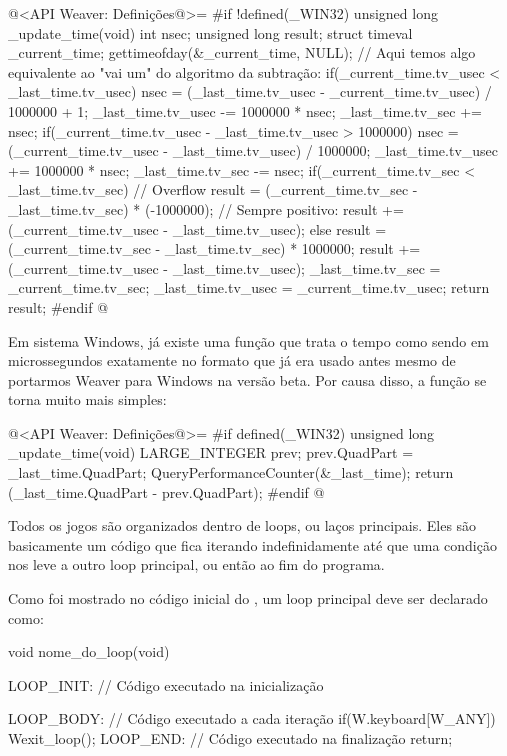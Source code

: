 \iniciocodigo
@<API Weaver: Definições@>=
#if !defined(_WIN32)
unsigned long _update_time(void){
  int nsec;
  unsigned long result;
  struct timeval _current_time;
  gettimeofday(&_current_time, NULL);
  // Aqui temos algo equivalente ao "vai um" do algoritmo da subtração:
  if(_current_time.tv_usec < _last_time.tv_usec){
    nsec = (_last_time.tv_usec - _current_time.tv_usec) / 1000000 + 1;
    _last_time.tv_usec -= 1000000 * nsec;
    _last_time.tv_sec += nsec;
  }
  if(_current_time.tv_usec - _last_time.tv_usec > 1000000){
    nsec = (_current_time.tv_usec - _last_time.tv_usec) / 1000000;
    _last_time.tv_usec += 1000000 * nsec;
    _last_time.tv_sec -= nsec;
  }
  if(_current_time.tv_sec < _last_time.tv_sec){
    // Overflow
    result = (_current_time.tv_sec - _last_time.tv_sec) * (-1000000);
    // Sempre positivo:
    result += (_current_time.tv_usec - _last_time.tv_usec);
  }
  else{
    result = (_current_time.tv_sec - _last_time.tv_sec) * 1000000;
    result += (_current_time.tv_usec - _last_time.tv_usec);
  }
  _last_time.tv_sec = _current_time.tv_sec;
  _last_time.tv_usec = _current_time.tv_usec;
  return result;
}
#endif
@
\fimcodigo

Em sistema Windows, já existe uma função que trata o tempo como sendo
em microssegundos exatamente no formato que já era usado antes mesmo
de portarmos Weaver para Windows na versão beta. Por causa disso, a
função se torna muito mais simples:

\iniciocodigo
@<API Weaver: Definições@>=
#if defined(_WIN32)
unsigned long _update_time(void){
  LARGE_INTEGER prev;
  prev.QuadPart = _last_time.QuadPart;
  QueryPerformanceCounter(&_last_time);
  return (_last_time.QuadPart - prev.QuadPart);
}
#endif
@
\fimcodigo


Todos os jogos são organizados dentro de loops, ou laços
principais. Eles são basicamente um código que fica iterando
indefinidamente até que uma condição nos leve a outro loop principal,
ou então ao fim do programa.

Como foi mostrado no código inicial do , um loop
principal deve ser declarado como:

\alinhaverbatim
void nome\_do\_loop(void){
 LOOP\_INIT: // Código executado na inicialização

 LOOP\_BODY: // Código executado a cada iteração
    if(W.keyboard[W\_ANY])
        Wexit\_loop();
 LOOP\_END: // Código executado na finalização
    return;
}
\alinhanormal

